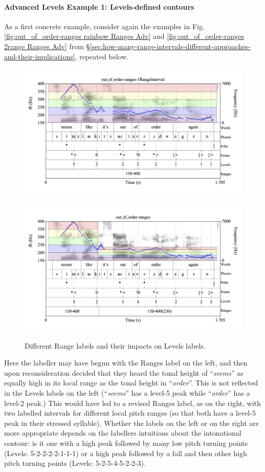 \documentclass[11pt, twoside]{memoir}
\def\langtext#1{\textit{#1}}
\begin{document}
\paragraph{Advanced Levels Example 1: Levels-defined contours}

As a first concrete example, consider again the examples in Fig. \ref{fig:out_of_order-ranges rainbow Ranges Adv} and \ref{fig:out_of_order-ranges 2range Ranges Adv} from §\ref{sec:how-many-range-intervals-different-approaches-and-their-implications}, repeated below.

\begin{figure}[H]
\centering
%
\includegraphics[width=.485\linewidth]{out_of_order-ranges-1RangeInterval-rainbow.png}~~\includegraphics[width=.485\linewidth]{out_of_order-ranges-2RangeIntervals.png}
%
\caption{Different Range labels and their impacts on Levels labels.%
\label{fig:out of order Levels Adv}%
}
\end{figure}

Here the labeller may have begun with the Ranges label on the left, and then upon reconsideration decided that they heard the tonal height of “\langtext{seems}” as equally high in its local range as the tonal height in “\langtext{order}”. This is not reflected in the Levels labels on the left (“\langtext{seems}” has a  level-5 peak while “\langtext{order}” has a level-2 peak.) This would have led to a revised Ranges label, as on the right, with two labelled intervals for different local pitch ranges (so that both have a level-5 peak in their stressed syllable). Whether the labels on the left or on the right are more appropriate depends on the labellers intuitions about the intonational contour: is it one with a high peak followed by many low pitch turning points (Levels: 5-2-2-2-2-1-1-1) or a high peak followed by a fall and then other high pitch turning points (Levels: 5-2-5-4-5-2-2-3).
\end{document}
